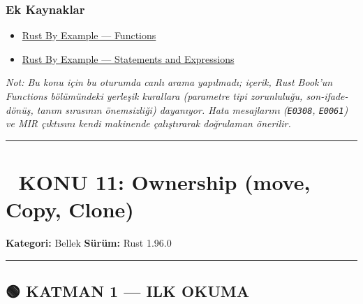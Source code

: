 \documentclass[12pt,a4paper]{article}
\begin{document}
\subsubsection{Ek Kaynaklar}\label{ek-kaynaklar-9}

\begin{itemize}
\tightlist
\item
  \href{https://doc.rust-lang.org/rust-by-example/fn.html}{Rust By Example --- Functions}
\item
  \href{https://doc.rust-lang.org/rust-by-example/expression.html}{Rust By Example --- Statements and Expressions}
\end{itemize}

\emph{Not: Bu konu için bu oturumda canlı arama yapılmadı; içerik, Rust Book'un Functions bölümündeki yerleşik kurallara (parametre tipi zorunluluğu, son-ifade-dönüş, tanım sırasının önemsizliği) dayanıyor. Hata mesajlarını (\texttt{E0308}, \texttt{E0061}) ve MIR çıktısını kendi makinende çalıştırarak doğrulaman önerilir.}

\begin{center}\rule{0.5\linewidth}{0.5pt}\end{center}

\section{📘 KONU 11: Ownership (move, Copy, Clone)}\label{konu-11-ownership-move-copy-clone}

\textbf{Kategori:} Bellek \textbar{} \textbf{Sürüm:} Rust 1.96.0

\begin{center}\rule{0.5\linewidth}{0.5pt}\end{center}

\subsection{🟢 KATMAN 1 --- ILK OKUMA}\label{katman-1-—-ilk-okuma-10}
\end{document}
